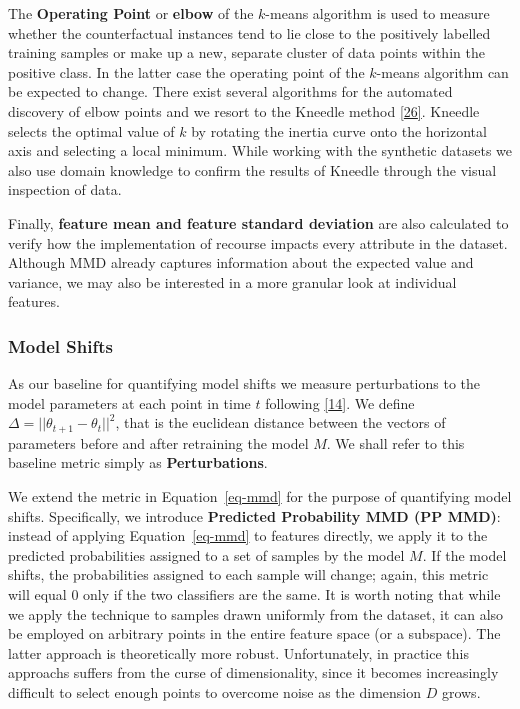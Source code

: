 \documentclass[
  conference]{IEEEtran}
\begin{document}
The \textbf{Operating Point} or \textbf{elbow} of the \(k\)-means
algorithm is used to measure whether the counterfactual instances tend
to lie close to the positively labelled training samples or make up a
new, separate cluster of data points within the positive class. In the
latter case the operating point of the \(k\)-means algorithm can be
expected to change. There exist several algorithms for the automated
discovery of elbow points and we resort to the Kneedle method
\protect\hyperlink{ref-satopaa2011finding}{{[}26{]}}. Kneedle selects
the optimal value of \(k\) by rotating the inertia curve onto the
horizontal axis and selecting a local minimum. While working with the
synthetic datasets we also use domain knowledge to confirm the results
of Kneedle through the visual inspection of data.

Finally, \textbf{feature mean and feature standard deviation} are also
calculated to verify how the implementation of recourse impacts every
attribute in the dataset. Although MMD already captures information
about the expected value and variance, we may also be interested in a
more granular look at individual features.

\hypertarget{model-shifts}{%
\subsubsection{Model Shifts}\label{model-shifts}}

As our baseline for quantifying model shifts we measure perturbations to
the model parameters at each point in time \(t\) following
\protect\hyperlink{ref-upadhyay2021towards}{{[}14{]}}. We define
\(\Delta=||\theta_{t+1}-\theta_{t}||^2\), that is the euclidean distance
between the vectors of parameters before and after retraining the model
\(M\). We shall refer to this baseline metric simply as
\textbf{Perturbations}.

We extend the metric in Equation~\ref{eq-mmd} for the purpose of
quantifying model shifts. Specifically, we introduce \textbf{Predicted
Probability MMD (PP MMD)}: instead of applying Equation~\ref{eq-mmd} to
features directly, we apply it to the predicted probabilities assigned
to a set of samples by the model \(M\). If the model shifts, the
probabilities assigned to each sample will change; again, this metric
will equal 0 only if the two classifiers are the same. It is worth
noting that while we apply the technique to samples drawn uniformly from
the dataset, it can also be employed on arbitrary points in the entire
feature space (or a subspace). The latter approach is theoretically more
robust. Unfortunately, in practice this approachs suffers from the curse
of dimensionality, since it becomes increasingly difficult to select
enough points to overcome noise as the dimension \(D\) grows.
\end{document}
